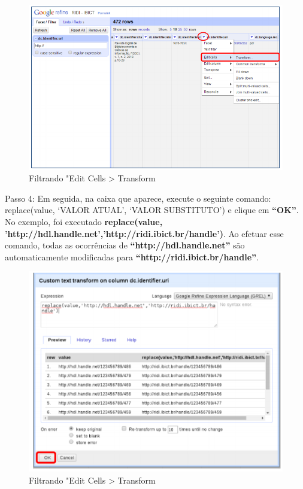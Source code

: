 \documentclass[12pt,hidelinks]{article}
\begin{document}
    \begin{figure}[!htp]
                \centering
                \includegraphics[scale=0.8]{figura/Figura198.png}
                \caption{Filtrando "Edit Cells > Transform}
            \label{Rotulo}
        \end{figure}
    
    Passo 4: Em seguida, na caixa que aparece, execute o seguinte comando: replace(value, ‘VALOR ATUAL’, ‘VALOR SUBSTITUTO’) e clique em \textbf{“OK”}. No exemplo, foi executado \textbf{replace(value, 'http://hdl.handle.net','http://ridi.ibict.br/handle')}. Ao efetuar esse comando, todas as ocorrências de \textbf{“http://hdl.handle.net”} são automaticamente modificadas para \textbf{“http://ridi.ibict.br/handle”}.
    
    \begin{figure}[!htp]
                \centering
                \includegraphics[scale=0.8]{figura/Figura199.png}
                \caption{Filtrando "Edit Cells > Transform}
            \label{Rotulo}
        \end{figure}
    
\end{document}

